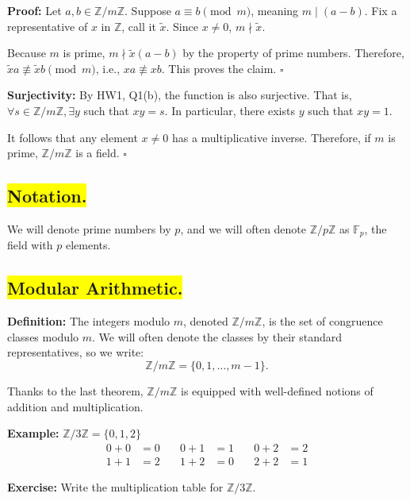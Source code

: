\textbf{Proof:} Let \( a, b \in \mathbb{Z}/m\mathbb{Z} \). Suppose \( a \equiv b \pmod{m} \), meaning \( m \mid (a - b) \). Fix a representative of \( x \) in \( \mathbb{Z} \), call it \( \tilde{x} \). Since \( x \neq 0 \), \( m \nmid \tilde{x} \).

Because \( m \) is prime, \( m \nmid \tilde{x}(a - b) \) by the property of prime numbers. Therefore, \( \tilde{x}a \not\equiv \tilde{x}b \pmod{m} \), i.e., \( xa \not\equiv xb \). This proves the claim. \(\square\)

\textbf{Surjectivity:} By HW1, Q1(b), the function is also surjective. That is, \( \forall s \in \mathbb{Z}/m\mathbb{Z}, \exists y \) such that \( xy = s \). In particular, there exists \( y \) such that \( xy = 1 \).

It follows that any element \( x \neq 0 \) has a multiplicative inverse. Therefore, if \( m \) is prime, \( \mathbb{Z}/m\mathbb{Z} \) is a field. \(\square\)

\subsection*{\colorbox{yellow}{Notation.}}
We will denote prime numbers by \( p \), and we will often denote \( \mathbb{Z}/p\mathbb{Z} \) as \( \mathbb{F}_p \), the field with \( p \) elements.

\subsection*{\colorbox{yellow}{Modular Arithmetic.}}

\textbf{Definition:} The integers modulo \( m \), denoted \( \mathbb{Z}/m\mathbb{Z} \), is the set of congruence classes modulo \( m \). We will often denote the classes by their standard representatives, so we write:
\[
\mathbb{Z}/m\mathbb{Z} = \{0, 1, \dots, m-1\}.
\]

Thanks to the last theorem, \( \mathbb{Z}/m\mathbb{Z} \) is equipped with well-defined notions of addition and multiplication.

\textbf{Example:} \( \mathbb{Z}/3\mathbb{Z} = \{0, 1, 2\} \)
\[
\begin{aligned}
    0 + 0 &= 0 \quad & 0 + 1 &= 1 \quad & 0 + 2 &= 2 \\
    1 + 1 &= 2 \quad & 1 + 2 &= 0 \quad & 2 + 2 &= 1
\end{aligned}
\]

\textbf{Exercise:} Write the multiplication table for \( \mathbb{Z}/3\mathbb{Z} \).

